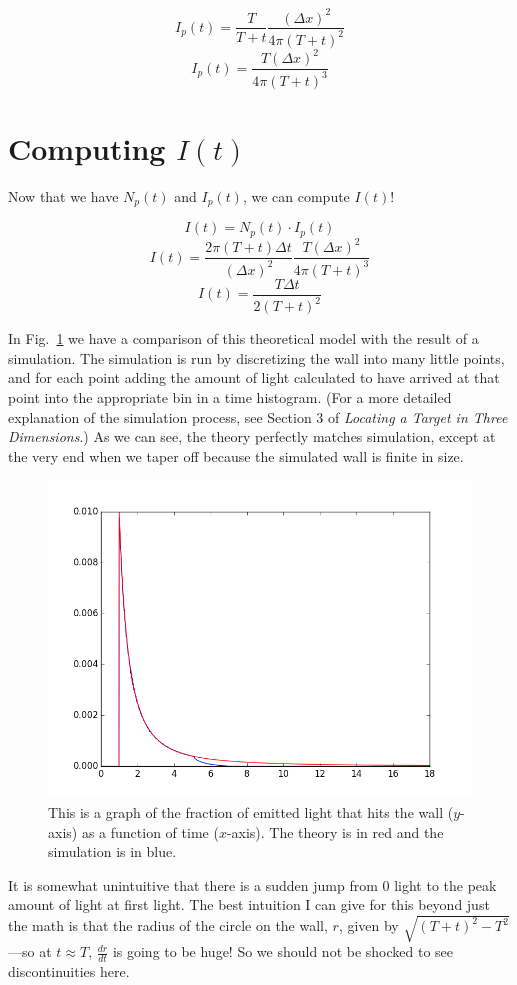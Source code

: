 \documentclass[11pt]{article}
\begin{document}
$$I_p(t) = \frac{T}{T+t} \frac{(\Delta x)^2}{4\pi(T+t)^2}$$
$$I_p(t) = \frac{T(\Delta x)^2}{4\pi(T+t)^3}$$

\section{Computing $I(t)$}

Now that we have $N_p(t)$ and $I_p(t)$, we can compute $I(t)$!

$$I(t) = N_p(t) \cdot I_p(t)$$
$$I(t) = \frac{2\pi(T+t)\Delta t}{(\Delta x)^2} \frac{T(\Delta x)^2}{4\pi(T+t)^3}$$
$$I(t) = \frac{T \Delta t}{2 (T+t)^2}$$

In Fig.~\ref{fig:spherepoint} we have a comparison of this theoretical model with the result of a simulation. The simulation is run by discretizing the wall into many little points, and for each point adding the amount of light calculated to have arrived at that point into the appropriate bin in a time histogram. (For a more detailed explanation of the simulation process, see Section 3 of \emph{Locating a Target in Three Dimensions}.) As we can see, the theory perfectly matches simulation, except at the very end when we taper off because the simulated wall is finite in size.

\begin{figure}
\begin{center}
\includegraphics[scale=0.6]{figs/spherepoint.png}
\caption{This is a graph of the fraction of emitted light that hits the wall ($y$-axis) as a function of time ($x$-axis). The theory is in red and the simulation is in blue. \label{fig:spherepoint}}
\end{center}
\end{figure}

It is somewhat unintuitive that there is a sudden jump from 0 light to the peak amount of light at first light. The best intuition I can give for this beyond just the math is that the radius of the circle on the wall, $r$, given by $\sqrt{(T+t)^2 - T^2}$---so at $t \approx T$, $\frac{dr}{dt}$ is going to be huge! So we should not be shocked to see discontinuities here.
\end{document}
